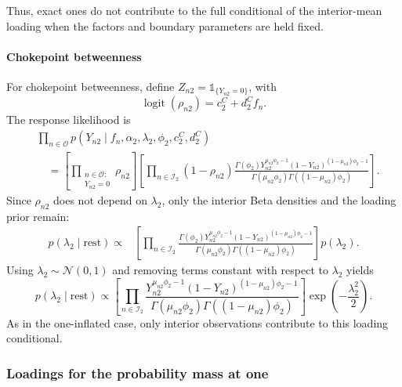 \documentclass[pdftex,12pt,openright,a4paper,oneside]{book}
\begin{document}
Thus, exact ones do not contribute to the full
conditional of the interior-mean loading when
the factors and boundary parameters are held fixed.

\paragraph{Chokepoint betweenness}

For chokepoint betweenness, define
$Z_{n2}=\mathds{1}_{\{Y_{n2}=0\}}$, with
\begin{equation*}
\operatorname{logit}(\rho_{n2})=
c_2^C+d_2^Cf_n.
\end{equation*}
The response likelihood is
\begin{equation*}
\begin{aligned}
&\prod_{n\in\mathcal{O}}
p(Y_{n2}\mid f_n,\alpha_2,\lambda_2,
\phi_2,c_2^C,d_2^C)
\\
&\quad=
\left[
\prod_{\substack{n\in\mathcal{O}:\\Y_{n2}=0}}
\rho_{n2}
\right]
\left[
\prod_{n\in\mathcal{I}_2}
(1-\rho_{n2})
\frac{
\Gamma(\phi_2)
Y_{n2}^{\mu_{n2}\phi_2-1}
(1-Y_{n2})^{(1-\mu_{n2})\phi_2-1}
}{
\Gamma(\mu_{n2}\phi_2)
\Gamma((1-\mu_{n2})\phi_2)
}
\right].
\end{aligned}
\end{equation*}
Since $\rho_{n2}$ does not depend on $\lambda_2$,
only the interior Beta densities and the loading
prior remain:
\begin{equation*}
\begin{aligned}
p(\lambda_2\mid\mathrm{rest})
\propto {}&
\left[
\prod_{n\in\mathcal{I}_2}
\frac{
\Gamma(\phi_2)
Y_{n2}^{\mu_{n2}\phi_2-1}
(1-Y_{n2})^{(1-\mu_{n2})\phi_2-1}
}{
\Gamma(\mu_{n2}\phi_2)
\Gamma((1-\mu_{n2})\phi_2)
}
\right]
p(\lambda_2).
\end{aligned}
\end{equation*}
Using $\lambda_2\sim\mathcal{N}(0,1)$ and removing
terms constant with respect to $\lambda_2$ yields
\begin{equation*}
p(\lambda_2\mid\mathrm{rest})
\propto
\left[
\prod_{n\in\mathcal{I}_2}
\frac{
Y_{n2}^{\mu_{n2}\phi_2-1}
(1-Y_{n2})^{(1-\mu_{n2})\phi_2-1}
}{
\Gamma(\mu_{n2}\phi_2)
\Gamma((1-\mu_{n2})\phi_2)
}
\right]
\exp\!\left(-\frac{\lambda_2^2}{2}\right).
\end{equation*}
As in the one-inflated case, only interior observations
contribute to this loading conditional.


\subsubsection{Loadings for the probability mass at one}
\end{document}
